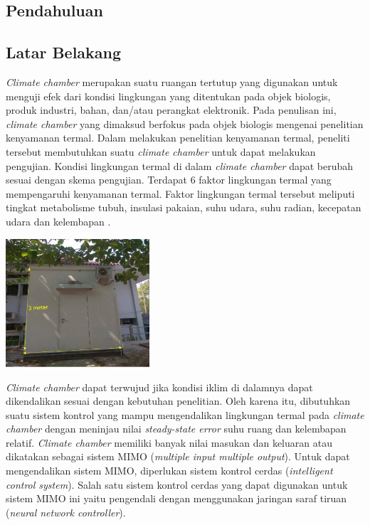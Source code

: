 \documentclass[a4paper,10pt]{article}
\makeatletter
\newenvironment{body}{\begin{multicols}{2}}{\end{multicols}}
\renewenvironment{figure}
{\def\@captype{figure}%
	\captionsetup{labelsep=period,format=hang,font=footnotesize,justification=justified}
}
{}
\makeatother
\begin{document}
	\begin{body}
		\section{Pendahuluan}
		
		\subsection{Latar Belakang}\label{latar belakang}
		
		\textit{Climate chamber} merupakan suatu ruangan tertutup yang digunakan untuk menguji efek dari kondisi lingkungan yang ditentukan pada objek biologis, produk industri, bahan, dan/atau perangkat elektronik. Pada penulisan ini, \textit{climate chamber} yang dimaksud berfokus pada objek biologis mengenai penelitian kenyamanan termal. Dalam melakukan penelitian kenyamanan termal, peneliti tersebut membutuhkan suatu \textit{climate chamber} untuk dapat melakukan pengujian. Kondisi lingkungan termal di dalam \textit{climate chamber} dapat berubah sesuai dengan skema pengujian. Terdapat 6 faktor lingkungan termal yang mempengaruhi kenyamanan termal. Faktor lingkungan termal tersebut meliputi tingkat metabolisme tubuh, insulasi pakaian, suhu udara, suhu radian, kecepatan udara dan kelembapan \cite{ASHRAE55}.
		
		\begin{figure}
			\centering
			\includegraphics[width=0.4\textwidth]{figures/climatechamber}
			\caption{\textit{Climate chamber} DTNTF FT-UGM}
			\label{fig:1:climatechamber}
		\end{figure}
		
		\textit{Climate chamber} dapat terwujud jika kondisi iklim di dalamnya dapat dikendalikan sesuai dengan kebutuhan penelitian. Oleh karena itu, dibutuhkan suatu sistem kontrol yang mampu mengendalikan lingkungan termal pada \textit{climate chamber} dengan meninjau nilai \textit{steady-state error} suhu ruang dan kelembapan relatif. \textit{Climate chamber} memiliki banyak nilai masukan dan keluaran atau dikatakan sebagai sistem MIMO (\textit{multiple input multiple output}). Untuk dapat mengendalikan sistem MIMO, diperlukan sistem kontrol cerdas (\textit{intelligent control system}). Salah satu sistem kontrol cerdas yang dapat digunakan untuk sistem MIMO ini yaitu pengendali dengan menggunakan jaringan saraf tiruan (\textit{neural network controller}).\\
		

\end{body}
\end{document}

